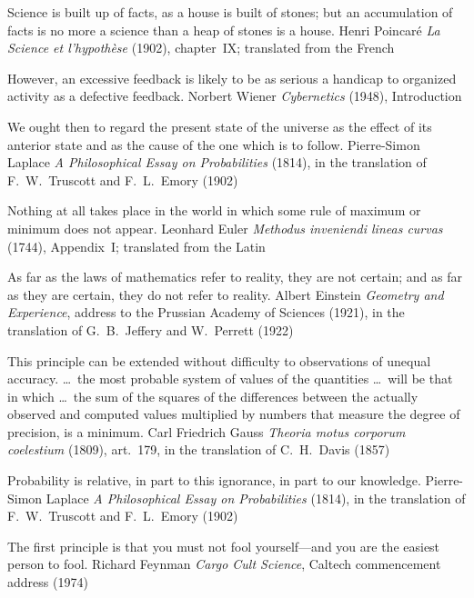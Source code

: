   {Science is built up of facts, as a house is built of stones; but an accumulation of facts is no
   more a science than a heap of stones is a house.}
  {Henri Poincaré}
  {\emph{La Science et l'hypothèse} (1902), chapter~IX; translated from the French}

  {However, an excessive feedback is likely to be as serious a handicap to organized activity as a
   defective feedback.}
  {Norbert Wiener}
  {\emph{Cybernetics} (1948), Introduction}

  {We ought then to regard the present state of the universe as the effect of its anterior state
   and as the cause of the one which is to follow.}
  {Pierre-Simon Laplace}
  {\emph{A Philosophical Essay on Probabilities} (1814), in the translation of F.~W.~Truscott and
   F.~L.~Emory (1902)}

  {Nothing at all takes place in the world in which some rule of maximum or minimum does not
   appear.}
  {Leonhard Euler}
  {\emph{Methodus inveniendi lineas curvas} (1744), Appendix~I; translated from the Latin}

  {As far as the laws of mathematics refer to reality, they are not certain; and as far as they
   are certain, they do not refer to reality.}
  {Albert Einstein}
  {\emph{Geometry and Experience}, address to the Prussian Academy of Sciences (1921), in the
   translation of G.~B.~Jeffery and W.~Perrett (1922)}

  {This principle can be extended without difficulty to observations of unequal accuracy.
   \ldots\ the most probable system of values of the quantities \ldots\ will be that in which
   \ldots\ the sum of the squares of the differences between the actually observed and computed
   values multiplied by numbers that measure the degree of precision, is a minimum.}
  {Carl Friedrich Gauss}
  {\emph{Theoria motus corporum coelestium} (1809), art.~179, in the translation of C.~H.~Davis
   (1857)}

  {Probability is relative, in part to this ignorance, in part to our knowledge.}
  {Pierre-Simon Laplace}
  {\emph{A Philosophical Essay on Probabilities} (1814), in the translation of F.~W.~Truscott and
   F.~L.~Emory (1902)}

  {The first principle is that you must not fool yourself---and you are the easiest person to fool.}
  {Richard Feynman}
  {\emph{Cargo Cult Science}, Caltech commencement address (1974)}

